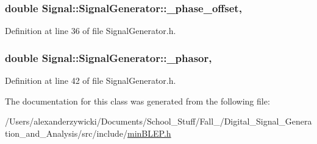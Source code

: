 \hypertarget{classSignal_1_1SignalGenerator_a6b4444d46747c8517171edbbf4b5588f}{
\subsubsection[{\+\_\+phase\+\_\+offset}]{\setlength{\rightskip}{0pt plus 5cm}double Signal\+::\+Signal\+Generator\+::\+\_\+phase\+\_\+offset\hspace{0.3cm}{\ttfamily [protected]}, {\ttfamily [inherited]}}}\label{classSignal_1_1SignalGenerator_a6b4444d46747c8517171edbbf4b5588f}


Definition at line 36 of file Signal\+Generator.\+h.

\hypertarget{classSignal_1_1SignalGenerator_af4aa0728ded00777be26a06d883eaeb3}{
\subsubsection[{\+\_\+phasor}]{\setlength{\rightskip}{0pt plus 5cm}double Signal\+::\+Signal\+Generator\+::\+\_\+phasor\hspace{0.3cm}{\ttfamily [protected]}, {\ttfamily [inherited]}}}\label{classSignal_1_1SignalGenerator_af4aa0728ded00777be26a06d883eaeb3}


Definition at line 42 of file Signal\+Generator.\+h.



The documentation for this class was generated from the following file\+:\begin{DoxyCompactItemize}
\item 
/\+Users/alexanderzywicki/\+Documents/\+School\+\_\+\+Stuff/\+Fall\+\_/\+Digital\+\_\+\+Signal\+\_\+\+Generation\+\_\+and\+\_\+\+Analysis/src/include/\hyperlink{minBLEP_8h}{min\+B\+L\+E\+P.\+h}\end{DoxyCompactItemize}
